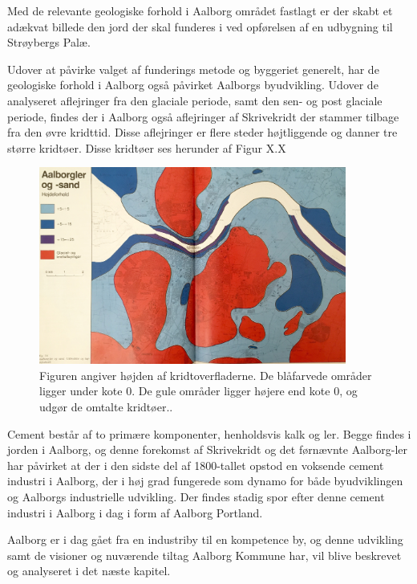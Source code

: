 Med de relevante geologiske forhold i Aalborg området fastlagt er der skabt et adækvat billede den jord der skal funderes i ved opførelsen af en udbygning til Strøybergs Palæ. 

Udover at påvirke valget af funderings metode og byggeriet generelt, har de geologiske forhold i Aalborg også påvirket Aalborgs byudvikling. Udover de analyseret aflejringer fra den glaciale periode, samt den sen- og post glaciale periode, findes der i Aalborg også aflejringer af Skrivekridt der stammer tilbage fra den øvre kridttid. Disse aflejringer er flere steder højtliggende og danner tre større kridtøer. Disse kridtøer ses herunder af Figur X.X

\begin{figure}[H] 
\centering
\includegraphics[width=0.90\textwidth]{billeder/GHU4}
\caption{Figuren angiver højden af kridtoverfladerne. De blåfarvede områder ligger under kote 0. De gule områder ligger højere end kote 0, og udgør de omtalte kridtøer..}
\label{fig:GHU2}
\end{figure}

Cement består af to primære komponenter, henholdsvis kalk og ler. Begge findes i jorden i Aalborg, og denne forekomst af Skrivekridt og det førnævnte Aalborg-ler har påvirket at der i den sidste del af 1800-tallet opstod en voksende cement industri i Aalborg, der i høj grad fungerede som dynamo for både byudviklingen og Aalborgs industrielle udvikling. Der findes stadig spor efter denne cement industri i Aalborg i dag i form af Aalborg Portland.

Aalborg er i dag gået fra en industriby til en kompetence by, og denne udvikling samt de visioner og nuværende tiltag Aalborg Kommune har, vil blive beskrevet og analyseret i det næste kapitel.   



